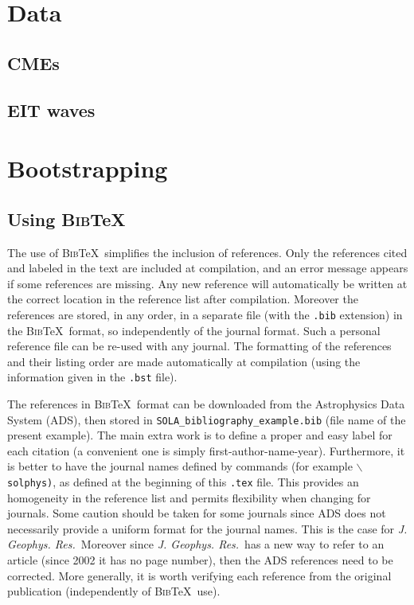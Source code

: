 \documentclass[namedreferences]{SolarPhysics}
\newcommand{\BibTeX}{\textsc{Bib}\TeX}
\newcommand{\jgr}{    {\it J. Geophys. Res.}}
\begin{document}
\begin{article}
\section{Data}

\subsection{CMEs}

\subsection{EIT waves}

\section{Bootstrapping}

      
\subsection{Using \BibTeX} %
  \label{S-BibTeX}
  The use of \BibTeX\ simplifies the inclusion of references. Only the 
references cited and labeled in the text are included at compilation, 
and an error message appears if some references
are missing.  Any new reference will automatically be written at the correct 
location in the reference list after compilation. 
Moreover the references are stored, in any order, in a separate file
(with the \texttt{.bib} extension) in the \BibTeX\ format, so independently of 
the journal format. Such a personal reference file can be re-used with any journal.
The formatting of the references and their listing order are made automatically
at compilation (using the information given in the \texttt{.bst} file). 
        
  The references in \BibTeX\ format can be downloaded from the 
Astrophysics Data System (ADS), then stored
in \verb+SOLA_bibliography_example.bib+  (file name of the present example).
The main extra work is to define a proper and easy label for each citation
(a convenient one is simply first-author-name-year).  Furthermore, it is better
to have the journal names defined by commands (for example 
\texttt{$\backslash$solphys)}, as defined at the beginning of 
this \texttt{.tex} file.
This provides an homogeneity in the reference list and permits flexibility
when changing for journals.   Some caution should be taken for some journals
since ADS does not necessarily provide a uniform format for the
journal names. This is the case for \jgr\  Moreover since
\jgr\ has a new way to refer to an article 
(since 2002 it has no page number), then the ADS references need to be corrected. 
More generally, it is worth verifying
each reference from the original publication (independently of \BibTeX\ use).


\end{article}
\end{document}
